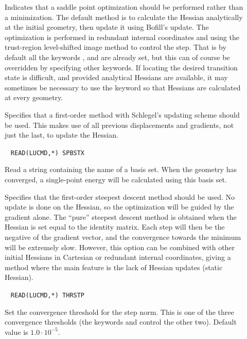 \begin{description}
\item[]
Indicates that a saddle point optimization should be performed rather
than a minimization. The default method is to calculate the Hessian
analytically at the initial geometry, then update it using Bofill's
update. The optimization is performed in redundant internal
coordinates and using the trust-region level-shifted image method to
control the step. That is by default all the keywords ,
 and  are already set, but this can of course
be overridden by specifying other keywords. If locating the desired
transition state is difficult, and provided analytical Hessians are
available, it may sometimes be necessary to use the 
keyword so that Hessians are calculated at every geometry.

\item[]
Specifies that a first-order method
with Schlegel's updating scheme
\cite{Schlegel} should be used. This makes use of all previous
displacements and gradients, not just the last, to update the
Hessian.

\item[]\verb| |
\newline
\verb|READ(LUCMD,*) SPBSTX|

Read a string containing the name of a basis set. When the geometry
has converged, a single-point energy will be calculated using this
basis set.

\item[]
Specifies that the first-order steepest descent method should be
used. No update is done on the Hessian, so the optimization will be
guided by the gradient alone. The ``pure'' steepest descent method is
obtained when the Hessian is set equal to the identity matrix. Each
step will then be the negative of the gradient vector, and the
convergence towards the minimum will be extremely slow. However, this
option can be combined with other initial Hessians in Cartesian or
redundant internal coordinates, giving a method
where the main feature is the lack of Hessian updates (static
Hessian).

\item[]\verb| |
\newline
\verb|READ(LUCMD,*) THRSTP|

Set the convergence threshold for the step
norm. This is one of the
three convergence thresholds (the keywords  and
 control the other two). Default value is $1.0\cdot
10^{-5}$.


\end{description}
